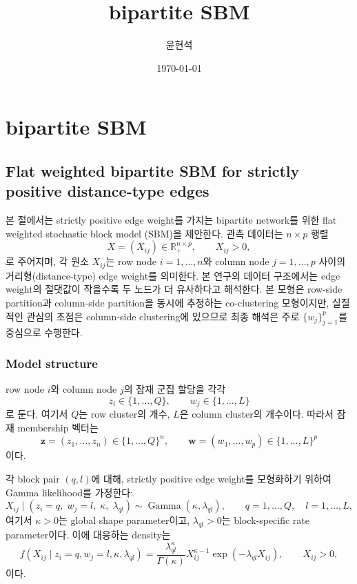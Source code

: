 \documentclass[A4paper,11pt]{article}
\title{bipartite SBM}
\author[]{윤현석}
\date{\today}
\begin{document}
\maketitle
\section{bipartite SBM}


\subsection{Flat weighted bipartite SBM for strictly positive distance-type edges}

본 절에서는 strictly positive edge weight를 가지는 bipartite network를 위한 flat weighted stochastic block model (SBM)을 제안한다. 관측 데이터는 $n \times p$ 행렬
\[
X = (X_{ij}) \in \mathbb{R}_{+}^{n\times p},
\qquad X_{ij} > 0,
\]
로 주어지며, 각 원소 $X_{ij}$는 row node $i=1,\ldots,n$와 column node $j=1,\ldots,p$ 사이의 거리형(distance-type) edge weight를 의미한다. 본 연구의 데이터 구조에서는 edge weight의 절댓값이 작을수록 두 노드가 더 유사하다고 해석한다. 본 모형은 row-side partition과 column-side partition을 동시에 추정하는 co-clustering 모형이지만, 실질적인 관심의 초점은 column-side clustering에 있으므로 최종 해석은 주로 $\{w_j\}_{j=1}^p$를 중심으로 수행한다.

\subsubsection{Model structure}

row node $i$와 column node $j$의 잠재 군집 할당을 각각
\[
z_i \in \{1,\ldots,Q\},
\qquad
w_j \in \{1,\ldots,L\}
\]
로 둔다. 여기서 $Q$는 row cluster의 개수, $L$은 column cluster의 개수이다. 따라서 잠재 membership 벡터는
\[
\mathbf{z} = (z_1,\ldots,z_n) \in \{1,\ldots,Q\}^{n},
\qquad
\mathbf{w} = (w_1,\ldots,w_p) \in \{1,\ldots,L\}^{p}
\]
이다.

각 block pair $(q,l)$에 대해, strictly positive edge weight를 모형화하기 위하여 Gamma likelihood를 가정한다:
\[
X_{ij} \mid (z_i=q,\; w_j=l,\; \kappa,\; \lambda_{ql})
\sim \operatorname{Gamma}(\kappa,\lambda_{ql}),
\qquad q=1,\ldots,Q,\quad l=1,\ldots,L,
\]
여기서 $\kappa>0$는 global shape parameter이고, $\lambda_{ql}>0$는 block-specific rate parameter이다. 이에 대응하는 density는
\[
f(X_{ij}\mid z_i=q,w_j=l,\kappa,\lambda_{ql})
=
\frac{\lambda_{ql}^{\kappa}}{\Gamma(\kappa)}
X_{ij}^{\kappa-1}
\exp(-\lambda_{ql}X_{ij}),
\qquad X_{ij}>0,
\]
이다.
\end{document}
